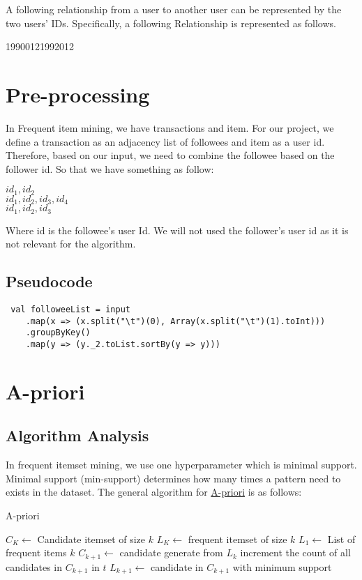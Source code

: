 \documentclass[11pt]{article}
\begin{document}
A following relationship from a user to another user can be represented by the two users' IDs.
Specifically, a following Relationship is represented as follows.

1990012\hspace{1cm}1992012

\section{Pre-processing}
In Frequent item mining, we have transactions and item.
For our project, we define a transaction as an adjacency list of followees and item as a user id.
Therefore, based on our input, we need to combine the followee based on the follower id.
So that we have something as follow: 

$id_1, id_2$ \\
$id_1, id_2, id_3, id_4$ \\
$id_1, id_2, id_3$

Where id is the followee's user Id.
We will not used the follower's user id as it is not relevant for the algorithm.

\subsection{Pseudocode}

\begin{lstlisting}
 val followeeList = input
    .map(x => (x.split("\t")(0), Array(x.split("\t")(1).toInt)))
    .groupByKey()
    .map(y => (y._2.toList.sortBy(y => y)))
\end{lstlisting}

\section{A-priori}

\subsection {Algorithm Analysis}

In frequent itemset mining, we use one hyperparameter which is minimal support.
Minimal support (min-support) determines how many times a pattern need to exists in the dataset.
The general algorithm for \href{https://www3.cs.stonybrook.edu/~cse634/lecture_notes/07apriori.pdf}{A-priori} is as follows:

\begin{algorithm}[H]
    \caption{A-priori}

    \begin{algorithmic}[1]
        \State $C_K \gets $ Candidate itemset of size $k$
        \State $L_K \gets $ frequent itemset of size $k$
        \State
        \State $L_1 \gets $ List of frequent items $k$
        \State
            \State $C_{k+1} \gets $ candidate generate from $L_k$
                \State increment the count of all candidates in $C_{k+1}$ in $t$
            \EndFor
            \State $L_{k+1} \gets$ candidate in $C_{k+1}$ with minimum support
        \EndFor
    \end{algorithmic}
\end{algorithm}
\end{document}
